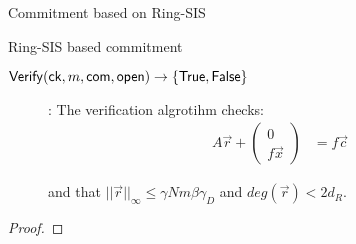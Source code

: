 \begin{section}{Commitment based on  Ring-SIS~\cite{DBLP:journals/iacr/BaumDOP16}}
\begin{construction}{Ring-SIS based commitment}
\begin{description}
          \item[${\mathsf{Verify}}(\mathsf{ck}, m, \mathsf{com}, \mathsf{open}) \to \{\mathsf{True}, \mathsf{False}\}$]: The verification algrotihm checks:
            \begin{align*}
              A\vec{r} + \left( \begin{matrix} 0 \\ f\vec{x} \end{matrix}\right) &= f\vec{c}
            \end{align*}
            
            and that $||\vec{r}||_\infty \leq \gamma N m \beta \gamma_D$ and $deg(\vec{r}) < 2 d_R$.
            
          \end{description}
        \end{construction}
        \begin{proof}
          
        \end{proof}
	
\end{section}


